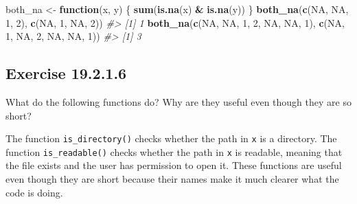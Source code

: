 \documentclass[]{book}
\newenvironment{Shaded}{\begin{snugshade}}{\end{snugshade}}
\newcommand{\CommentTok}[1]{\textcolor[rgb]{0.56,0.35,0.01}{\textit{#1}}}
\newcommand{\ControlFlowTok}[1]{\textcolor[rgb]{0.13,0.29,0.53}{\textbf{#1}}}
\newcommand{\DecValTok}[1]{\textcolor[rgb]{0.00,0.00,0.81}{#1}}
\newcommand{\KeywordTok}[1]{\textcolor[rgb]{0.13,0.29,0.53}{\textbf{#1}}}
\newcommand{\NormalTok}[1]{#1}
\newcommand{\OperatorTok}[1]{\textcolor[rgb]{0.81,0.36,0.00}{\textbf{#1}}}
\newcommand{\OtherTok}[1]{\textcolor[rgb]{0.56,0.35,0.01}{#1}}
\newcommand{\StringTok}[1]{\textcolor[rgb]{0.31,0.60,0.02}{#1}}
\theoremstyle{plain}
\theoremstyle{remark}
\begin{document}
\begin{Shaded}
\begin{Highlighting}[]
\NormalTok{both_na <-}\StringTok{ }\ControlFlowTok{function}\NormalTok{(x, y) \{}
  \KeywordTok{sum}\NormalTok{(}\KeywordTok{is.na}\NormalTok{(x) }\OperatorTok{&}\StringTok{ }\KeywordTok{is.na}\NormalTok{(y))}
\NormalTok{\}}
\KeywordTok{both_na}\NormalTok{(}\KeywordTok{c}\NormalTok{(}\OtherTok{NA}\NormalTok{, }\OtherTok{NA}\NormalTok{,  }\DecValTok{1}\NormalTok{, }\DecValTok{2}\NormalTok{),}
        \KeywordTok{c}\NormalTok{(}\OtherTok{NA}\NormalTok{,  }\DecValTok{1}\NormalTok{, }\OtherTok{NA}\NormalTok{, }\DecValTok{2}\NormalTok{))}
\CommentTok{#> [1] 1}
\KeywordTok{both_na}\NormalTok{(}\KeywordTok{c}\NormalTok{(}\OtherTok{NA}\NormalTok{, }\OtherTok{NA}\NormalTok{,  }\DecValTok{1}\NormalTok{, }\DecValTok{2}\NormalTok{, }\OtherTok{NA}\NormalTok{, }\OtherTok{NA}\NormalTok{, }\DecValTok{1}\NormalTok{),}
        \KeywordTok{c}\NormalTok{(}\OtherTok{NA}\NormalTok{,  }\DecValTok{1}\NormalTok{, }\OtherTok{NA}\NormalTok{, }\DecValTok{2}\NormalTok{, }\OtherTok{NA}\NormalTok{, }\OtherTok{NA}\NormalTok{, }\DecValTok{1}\NormalTok{))}
\CommentTok{#> [1] 3}
\end{Highlighting}
\end{Shaded}

\hypertarget{exercise-19.2.1.6}{%
\subsection*{\texorpdfstring{Exercise {19.2.1.6}}{Exercise 19.2.1.6}}\label{exercise-19.2.1.6}}

What do the following functions do? Why are they useful even though they are so short?

\begin{Shaded}
\end{Shaded}

The function \texttt{is\_directory()} checks whether the path in \texttt{x} is a directory.
The function \texttt{is\_readable()} checks whether the path in \texttt{x} is readable, meaning that the file exists and the user has permission to open it.
These functions are useful even though they are short because their names make it much clearer what the code is doing.
\end{document}
